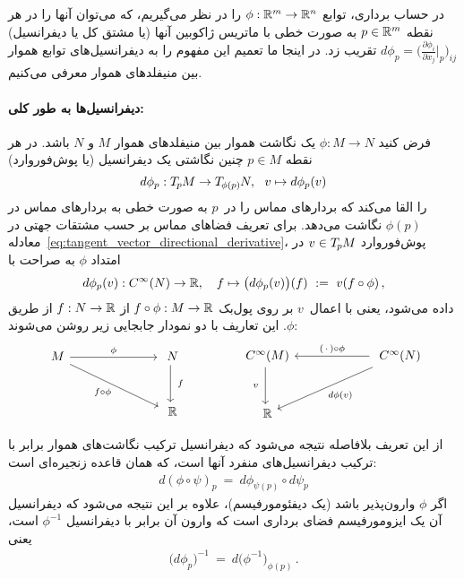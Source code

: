 در حساب برداری، توابع $\phi: \mathbb{R}^m \to \mathbb{R}^n$ را در نظر می‌گیریم، که می‌توان آنها را در هر نقطه $p\in \mathbb{R}^m$ به صورت خطی با ماتریس ژاکوبین آنها (یا مشتق کل یا دیفرانسیل) $d\phi_p = \big(\frac{\partial\phi_i}{\partial x_j} \big|_p \big)_{ij}$ تقریب زد.
در اینجا ما تعمیم این مفهوم را به دیفرانسیل‌های توابع هموار بین منیفلدهای هموار معرفی می‌کنیم.

\paragraph{دیفرانسیل‌ها به طور کلی:}
فرض کنید $\phi: M \to N$ یک نگاشت هموار بین منیفلدهای هموار $M$ و $N$ باشد.
در هر نقطه $p\in M$ چنین نگاشتی یک دیفرانسیل (یا پوش‌فوروارد)
\begin{align}
	d\phi_p : \TpM \to \TphipN,\ \ v \mapsto d\phi_p(v)
\end{align}
را القا می‌کند که بردارهای مماس را در~$p$ به صورت خطی به بردارهای مماس در $\phi(p)$ نگاشت می‌دهد.
برای تعریف فضاهای مماس بر حسب مشتقات جهتی در معادله~\eqref{eq:tangent_vector_directional_derivative}، پوش‌فوروارد $v \in T_{\mkern-1.5mu p}\mkern-.5muM$ در امتداد $\phi$ به صراحت با
\begin{align}
	d\phi_p(v): C^\infty(N) \to \R,\ \ \ f \mapsto \big( d\phi_p(v) \big)(f)\ :=\ v(f \circ \phi) \,,
\end{align}
داده می‌شود، یعنی با اعمال~$v$ بر روی پول‌بک $f \circ \phi: M \to \mathbb{R}$ از $f: N\to \mathbb{R}$ از طریق $\phi$.
این تعاریف با دو نمودار جابجایی زیر روشن می‌شوند:
\begin{equation}
	\begin{tikzcd}[column sep=70pt, row sep=30, font=\normalsize]
		M
		\arrow[r, "\phi"]
		\arrow[dr, "f \circ \phi"']
		&
		N
		\arrow[d, "\ f"]
		\\
		& \R
	\end{tikzcd}
	\qquad\qquad
	\begin{tikzcd}[column sep=60pt, row sep=30, font=\normalsize]
		C^\infty(M)
		\arrow[d, "v\ "']
		&
		C^\infty(N)
		\arrow[l, "{(\,\cdot\,) \circ \phi}"']
		\arrow[dl, "{d\phi(v)}"]
		\\
		\R
	\end{tikzcd}
\end{equation}

از این تعریف بلافاصله نتیجه می‌شود که دیفرانسیل ترکیب نگاشت‌های هموار برابر با ترکیب دیفرانسیل‌های منفرد آنها است، که همان قاعده زنجیره‌ای است:
\begin{align}
	d(\phi \circ \psi)_p\ =\ d\phi_{\psi(p)} \circ d\psi_p
\end{align}
اگر $\phi$ وارون‌پذیر باشد (یک دیفئومورفیسم)، علاوه بر این نتیجه می‌شود که دیفرانسیل آن یک ایزومورفیسم فضای برداری است که وارون آن برابر با دیفرانسیل $\phi^{-1}$ است، یعنی
\begin{align}\label{eq:differential_inverse}
	\big( d\phi_{p} \big)^{-1}\ =\ d\big( \phi^{-1} \big)_{\phi(p)} \,.
\end{align}

